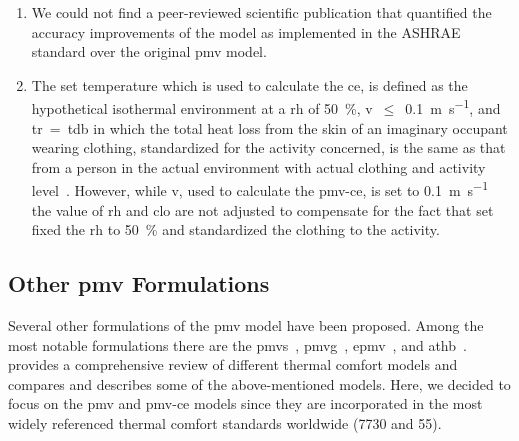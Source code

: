 \begin{enumerate}
    \item We could not find a peer-reviewed scientific publication that quantified the accuracy improvements of the model as implemented in the ASHRAE standard over the original \ac{pmv} model.
    \item The \ac{set} temperature which is used to calculate the \ac{ce}, is defined as the hypothetical isothermal environment at a \ac{rh} of \qty{50}{\percent}, \ac{v}~$\leq$~\qty{0.1}{\m\per\s}, and \ac{tr}~=~\ac{tdb} in which the total heat loss from the skin of an imaginary occupant wearing clothing, standardized for the activity concerned, is the same as that from a person in the actual environment with actual clothing and activity level~\cite{ashrae552023}.
    However, while \ac{v}, used to calculate the \ac{pmv-ce}, is set to \qty{0.1}{\m\per\s} the value of \ac{rh} and \ac{clo} are not adjusted to compensate for the fact that \ac{set} fixed the \ac{rh} to \qty{50}{\percent} and standardized the clothing to the activity.
\end{enumerate}

\subsection{Other \ac{pmv} Formulations}\label{subsec:other-pmv-formulations}
Several other formulations of the \ac{pmv} model have been proposed.
Among the most notable formulations there are the \ac{pmvs}~\cite{GaggeSET}, \ac{pmvg}~\cite{GaggeSET}, \ac{epmv}~\cite{Toftum2002}, and \ac{athb}~\cite{Schweiker2022}.
 provides a comprehensive review of different thermal comfort models and compares and describes some of the above-mentioned models.
Here, we decided to focus on the \ac{pmv} and \ac{pmv-ce} models since they are incorporated in the most widely referenced thermal comfort standards worldwide (\gls{7730} and \gls{55}).

